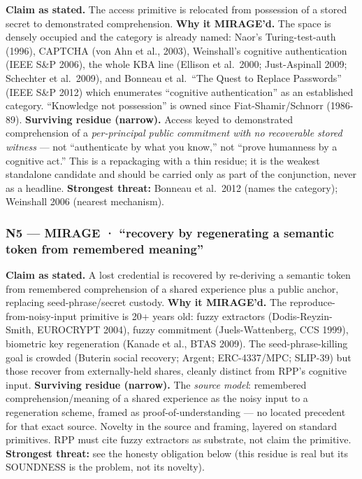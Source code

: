 \documentclass[
  11pt,
]{article}
\begin{document}
\textbf{Claim as stated.} The access primitive is relocated from
possession of a stored secret to demonstrated comprehension. \textbf{Why
it MIRAGE'd.} The space is densely occupied and the category is already
named: Naor's Turing-test-auth (1996), CAPTCHA (von Ahn et al., 2003),
Weinshall's cognitive authentication (IEEE S\&P 2006), the whole KBA
line (Ellison et al.~2000; Just-Aspinall 2009; Schechter et al.~2009),
and Bonneau et al.~``The Quest to Replace Passwords'' (IEEE S\&P 2012)
which enumerates ``cognitive authentication'' as an established
category. ``Knowledge not possession'' is owned since
Fiat-Shamir/Schnorr (1986-89). \textbf{Surviving residue (narrow).}
Access keyed to demonstrated comprehension of a \emph{per-principal
public commitment with no recoverable stored witness} --- not
``authenticate by what you know,'' not ``prove humanness by a cognitive
act.'' This is a repackaging with a thin residue; it is the weakest
standalone candidate and should be carried only as part of the
conjunction, never as a headline. \textbf{Strongest threat:} Bonneau et
al.~2012 (names the category); Weinshall 2006 (nearest mechanism).

\subsubsection{N5 --- MIRAGE · ``recovery by regenerating a semantic
token from remembered
meaning''}\label{n5-mirage-recovery-by-regenerating-a-semantic-token-from-remembered-meaning}

\textbf{Claim as stated.} A lost credential is recovered by re-deriving
a semantic token from remembered comprehension of a shared experience
plus a public anchor, replacing seed-phrase/secret custody. \textbf{Why
it MIRAGE'd.} The reproduce-from-noisy-input primitive is 20+ years old:
fuzzy extractors (Dodis-Reyzin-Smith, EUROCRYPT 2004), fuzzy commitment
(Juels-Wattenberg, CCS 1999), biometric key regeneration (Kanade et al.,
BTAS 2009). The seed-phrase-killing goal is crowded (Buterin social
recovery; Argent; ERC-4337/MPC; SLIP-39) but those recover from
externally-held shares, cleanly distinct from RPP's cognitive input.
\textbf{Surviving residue (narrow).} The \emph{source model}: remembered
comprehension/meaning of a shared experience as the noisy input to a
regeneration scheme, framed as proof-of-understanding --- no located
precedent for that exact source. Novelty in the source and framing,
layered on standard primitives. RPP must cite fuzzy extractors as
substrate, not claim the primitive. \textbf{Strongest threat:} see the
honesty obligation below (this residue is real but its SOUNDNESS is the
problem, not its novelty).
\end{document}
